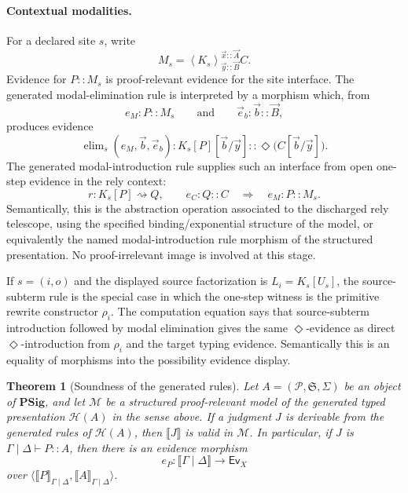 \documentclass[11pt]{article}
\newcommand{\rw}{\rightsquigarrow}
\newcommand{\ty}{\mathrel{::}}
\newcommand{\Dia}{\Diamond}
\newcommand{\Sig}{\Sigma}
\newcommand{\Ev}{\mathsf{Ev}}
\newcommand{\Mod}[4]{\left\langle #1\right\rangle^{#2}_{#3} #4}
\newtheorem{theorem}[definition]{Theorem}
\begin{document}
\paragraph{Contextual modalities.}
For a declared site \(s\), write
\[
  M_s=\Mod{K_s}{\vec x\ty\vec A}{\vec y\ty\vec B}{C}.
\]
Evidence for \(P\ty M_s\) is proof-relevant evidence for the site interface.
The generated modal-elimination rule is interpreted by a morphism which, from
\[
  e_M:P\ty M_s
  \qquad\text{and}\qquad
  \vec e_b:\vec b\ty\vec B,
\]
produces evidence
\[
  \operatorname{elim}_s(e_M,\vec b,\vec e_b):
  K_s[P][\vec b/\vec y]
  \ty
  \Dia\bigl(C[\vec b/\vec y]\bigr).
\]
The generated modal-introduction rule supplies such an interface from open
one-step evidence in the rely context:
\[
  r:K_s[P]\rw Q,
  \qquad
  e_C:Q\ty C
  \quad\Longrightarrow\quad
  e_M:P\ty M_s.
\]
Semantically, this is the abstraction operation associated to the discharged
rely telescope, using the specified binding/exponential structure of the model,
or equivalently the named modal-introduction rule morphism of the structured
presentation.  No proof-irrelevant image is involved at this stage.

If \(s=(i,o)\) and the displayed source factorization is \(L_i=K_s[U_s]\), the
source-subterm rule is the special case in which the one-step witness is the
primitive rewrite constructor \(\rho_i\).  The computation equation says that
source-subterm introduction followed by modal elimination gives the same
\(\Dia\)-evidence as direct \(\Dia\)-introduction from \(\rho_i\) and the target
typing evidence.  Semantically this is an equality of morphisms into the
possibility evidence display.

\begin{theorem}[Soundness of the generated rules]
\label{thm:soundness-full}
Let \(A=(\mathcal P,\mathfrak S,\Sig)\) be an object of
\(\mathbf{PSig}\), and let \(\mathcal M\) be a structured proof-relevant model
of the generated typed presentation \(\mathcal H(A)\) in the sense above.  If a
judgment \(J\) is derivable from the generated rules of \(\mathcal H(A)\), then
\(\llbracket J\rrbracket\) is valid in \(\mathcal M\).  In particular, if
\(J\) is \(\Gamma\mid\Delta\vdash P\ty A\), then there is an evidence morphism
\[
  e_P:\llbracket\Gamma\mid\Delta\rrbracket\longrightarrow\Ev_X
\]
over \(\langle\llbracket P\rrbracket_{\Gamma\mid\Delta},
\llbracket A\rrbracket_{\Gamma\mid\Delta}\rangle\).
\end{theorem}
\end{document}
